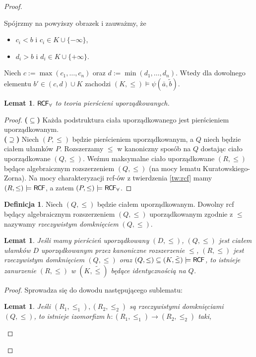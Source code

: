 \documentclass{article}
\theoremstyle{plain}
\newtheorem{lem}[thm]{Lemat}
\theoremstyle{definition}
\newtheorem{df}[thm]{Definicja}
\theoremstyle{remark}
\newcommand{\RCF}{\mathsf{R \mkern-1.7mu C \mkern-1.4mu F}}
\begin{document}
\begin{proof}
\begin{enumerate}
			Spójrzmy na powyższy obrazek i zauważmy, że
			\begin{itemize}
				\item $ c_i < b$ i $ c_i \in K \cup \{-\infty\}$,
				\item $ d_i > b$ i $ d_i \in K \cup \{+\infty\}$.
			\end{itemize}
			Niech $ c := \max (c_1, \ldots, c_n)$ oraz $ d := \min
			(d_1, \ldots, d_n)$. Wtedy dla dowolnego elementu
			$b' \in (c,d) \cup K$ zachodzi
			$(K, \leq) \models \psi(\bar{a},\tilde{b})$.
	\end{enumerate}
	\begin{lem}
		 $\RCF_{\forall}$ to teoria pierścieni uporządkowanych.
	\end{lem}
	\begin{proof}
		 \textbf{($ \subseteq$)} Każda podstruktura ciała
		 uporządkowanego jest pierścieniem uporządkowanym.
		 \\\textbf{($ \supseteq$)} Niech $ (P, \leq)$ będzie pierścieniem
		 uporządkowanym, a $Q$ niech będzie ciałem ułamków $P$.
		 Rozszerzamy $\leq$ w kanoniczny sposób na $Q$ dostając ciało
		 uporządkowane $ (Q, \leq)$.
		 Weźmu maksymalne ciało uporządkowane $(R, \leq)$ będące
		 algebraicznym rozszerzeniem $ (Q, \leq)$
		 (na mocy lematu Kuratowskiego-Zorna).
		 Na mocy charakteryzacji rcf-ów z twierdzenia \ref{tw:rcf} mamy
		 $(R, \leq) \models \RCF$, a zatem
		 $(P, \leq) \models \RCF_{\forall}$.
	\end{proof}
	\begin{df}
		 Niech $(Q, \leq)$ będzie ciałem uporządkowanym.
		 Dowolny rcf będący algebraicznym rozszerzeniem $(Q, \leq)$ uporządkowanym zgodnie z $ \leq$ nazywamy
		 \textit{rzeczywistym domknięciem} $ (Q, \leq)$.
	\end{df}
	\begin{lem}
		 Jeśli mamy pierścień uporządkowany $(D, \leq)$,
		 $(Q, \leq)$ jest ciałem ułamków $D$ uporządkowanym przez
		 kanoniczne rozszerzenie $\leq$,
		 $(R, \leq)$ jest rzeczywistym domknięciem $(Q, \leq)$
		 oraz $ (Q, \leq) \subseteq (K, \tilde{\leq}) \models \RCF$,
		 to istnieje zanurzenie $(R, \leq)$ w $(K, \tilde{\leq})$
		 będące identycznością na $Q$.
	\end{lem}
	\begin{proof}
		Sprowadza się do dowodu następującego sublematu:
		\begin{lem}
		\label{lem:sublem}
			Jeśli $(R_1, \leq_1), (R_2, \leq_2)$ są rzeczywistymi
			domknięciami $(Q, \leq)$, to istnieje izomorfizm
			$h \colon (R_1, \leq_1) \rightarrow (R_2, \leq_2)$ taki,

\end{lem}
\end{proof}
\end{proof}
\end{document}
